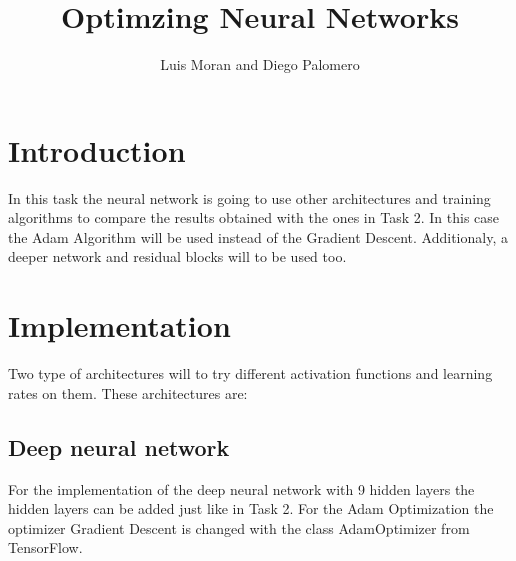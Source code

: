 \documentclass[11pt]{article} %
\title{Optimzing Neural Networks}
\author{Luis Moran and Diego Palomero}
\begin{document}
\maketitle

\section{Introduction}

In this task the neural network is going to use other architectures and training algorithms to compare the results obtained with the ones in Task 2. In this case 
the Adam Algorithm will be used instead of the Gradient Descent. Additionaly, a deeper network and residual blocks will to be used too.
\section{Implementation}
Two type of architectures will to try different activation functions and learning rates on them. These architectures are:
\subsection*{Deep neural network}
For the implementation of the deep neural network with 9 hidden layers the hidden layers can be added just like in Task 2. For the Adam Optimization the optimizer Gradient Descent is changed with the class
AdamOptimizer from TensorFlow. 
\end{document}

